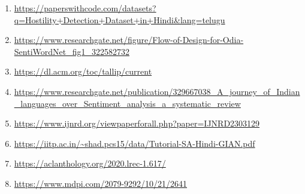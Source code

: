 \documentclass{article}
\begin{document}
\begin{enumerate}
\item \url{https://paperswithcode.com/datasets?q=Hostility+Detection+Dataset+in+Hindi&lang=telugu}
\item \url{https://www.researchgate.net/figure/Flow-of-Design-for-Odia-SentiWordNet_fig1_322582732}
\item \url{https://dl.acm.org/toc/tallip/current}
\item \url{https://www.researchgate.net/publication/329667038_A_journey_of_Indian_languages_over_Sentiment_analysis_a_systematic_review}
\item \url{https://www.ijnrd.org/viewpaperforall.php?paper=IJNRD2303129}
\item \url{https://iitp.ac.in/~shad.pcs15/data/Tutorial-SA-Hindi-GIAN.pdf}
\item \url{https://aclanthology.org/2020.lrec-1.617/}
\item \url{https://www.mdpi.com/2079-9292/10/21/2641}
\end{enumerate}
\end{document}
